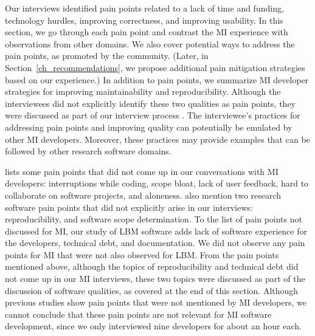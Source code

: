 \documentclass[final, 3p, times, authoryear]{elsarticle}
\begin{document}
Our interviews identified pain points related to a lack of time and funding,
technology hurdles, improving correctness, and improving usability.  In this
section, we go through each pain point and contrast the MI experience with
observations from other domains.  We also cover potential ways to address the
pain points, as promoted by the community.  (Later, in
Section~\ref{ch_recommendations}, we propose additional pain mitigation
strategies based on our experience.)  In addition to pain points, we summarize
MI developer strategies for improving maintainability and reproducibility.
Although the interviewees did not explicitly identify these two qualities as
pain points, they were discussed as part of our interview process
\citep{SmithEtAl2021}.  The interviewee's practices for addressing pain points
and improving quality can potentially be emulated by other MI developers.
Moreover, these practices may provide examples that can be followed by other
research software domains.

\citet{PintoEtAl2018} lists some pain points that did not come up in our
conversations with MI developers: interruptions while coding, scope bloat, lack
of user feedback, hard to collaborate on software projects, and aloneness.
\citet{WieseEtAl2019} also mention two research software pain points that did
not explicitly arise in our interviews: reproducibility, and software scope
determination.  To the list of pain points not discussed for MI, our study of
LBM software \citep{SmithEtAl2022} adds lack of software experience for the
developers, technical debt, and documentation. We did not observe any pain
points for MI that were not also observed for LBM. From the pain points
mentioned above, although the topics of reproducibility and technical debt did
not come up in our MI interviews, these two topics were discussed as part of the
discussion of software qualities, as covered at the end of this section.
Although previous studies show pain points that were not mentioned by MI
developers, we cannot conclude that these pain points are not relevant for MI
software development, since we only interviewed nine developers for about an
hour each.
\end{document}
